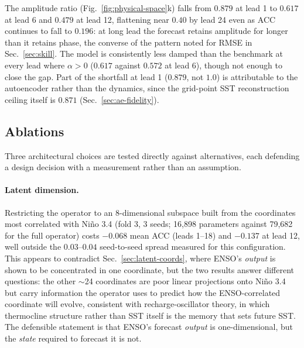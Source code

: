 The amplitude ratio (Fig.~\ref{fig:physical-space}k) falls from $0.879$ at lead 1 to $0.617$ at
lead 6 and $0.479$ at lead 12, flattening near $0.40$ by lead 24 even as ACC continues to fall
to $0.196$: at long lead the forecast retains amplitude for longer than it retains phase, the
converse of the pattern noted for RMSE in Sec.~\ref{sec:skill}. The model is consistently less
damped than the benchmark at every lead where $\alpha>0$ ($0.617$ against $0.572$ at lead 6),
though not enough to close the gap. Part of the shortfall at lead 1 ($0.879$, not $1.0$) is
attributable to the autoencoder rather than the dynamics, since the grid-point SST
reconstruction ceiling itself is $0.871$ (Sec.~\ref{sec:ae-fidelity}).

\subsection{Ablations}
\label{sec:ablations}

Three architectural choices are tested directly against alternatives, each defending a design
decision with a measurement rather than an assumption.

\paragraph{Latent dimension.} Restricting the operator to an 8-dimensional subspace built from
the coordinates most correlated with Ni\~no 3.4 (fold 3, 3 seeds; 16{,}898 parameters against
79{,}682 for the full operator) costs $-0.068$ mean ACC (leads 1--18) and $-0.137$ at lead 12,
well outside the $0.03$--$0.04$ seed-to-seed spread measured for this configuration. This
appears to contradict Sec.~\ref{sec:latent-coords}, where ENSO's \emph{output} is shown to be
concentrated in one coordinate, but the two results answer different questions: the other
$\sim$24 coordinates are poor linear projections onto Ni\~no 3.4 but carry information the
operator uses to predict how the ENSO-correlated coordinate will evolve, consistent with
recharge-oscillator theory, in which thermocline structure rather than SST itself is the
memory that sets future SST. The defensible statement is that ENSO's forecast \emph{output} is
one-dimensional, but the \emph{state} required to forecast it is not.

